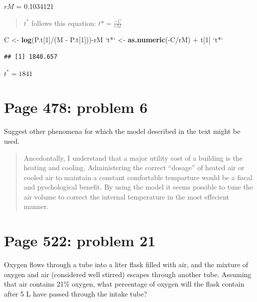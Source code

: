 \documentclass[]{article}
\newenvironment{Shaded}{\begin{snugshade}}{\end{snugshade}}
\newcommand{\KeywordTok}[1]{\textcolor[rgb]{0.13,0.29,0.53}{\textbf{{#1}}}}
\newcommand{\DataTypeTok}[1]{\textcolor[rgb]{0.13,0.29,0.53}{{#1}}}
\newcommand{\DecValTok}[1]{\textcolor[rgb]{0.00,0.00,0.81}{{#1}}}
\newcommand{\StringTok}[1]{\textcolor[rgb]{0.31,0.60,0.02}{{#1}}}
\newcommand{\NormalTok}[1]{{#1}}
\begin{document}
\(rM\) = 0.1034121

\begin{quote}
\(t^*\) follows this equation: \(t* = \frac{-C}{rM}\)
\end{quote}

\begin{Shaded}
\begin{Highlighting}[]
\NormalTok{C <-}\StringTok{ }\KeywordTok{log}\NormalTok{(P.t[}\DecValTok{1}\NormalTok{]/(M -}\StringTok{ }\NormalTok{P.t[}\DecValTok{1}\NormalTok{]))-rM}
\StringTok{`}\DataTypeTok{t*}\StringTok{`} \NormalTok{<-}\StringTok{ }\KeywordTok{as.numeric}\NormalTok{(-C/rM) +}\StringTok{ }\NormalTok{t[}\DecValTok{1}\NormalTok{]}
\StringTok{`}\DataTypeTok{t*}\StringTok{`} 
\end{Highlighting}
\end{Shaded}

\begin{verbatim}
## [1] 1840.657
\end{verbatim}

\(t^*= 1841\)

\newpage

\section{Page 478: problem 6}\label{page-478-problem-6}

Suggest other phenomena for which the model described in the text might
be used.

\begin{quote}
Ancedontally, I understand that a major utility cost of a building is
the heating and cooling. Administering the correct ``dosage'' of heated
air or cooled air to maintain a constant comfortable temparture would be
a fiscal and pyschological benefit. By using the model it seems possible
to tune the air volume to correct the internal temperature in the most
effecient manner.
\end{quote}

\section{Page 522: problem 21}\label{page-522-problem-21}

Oxygen flows through a tube into a liter flask filled with air, and the
mixture of oxygen and air (considered well stirred) escapes through
another tube. Assuming that air contains 21\% oxygen, what percentage of
oxygen will the flask contain after 5 L have passed through the intake
tube?
\end{document}
